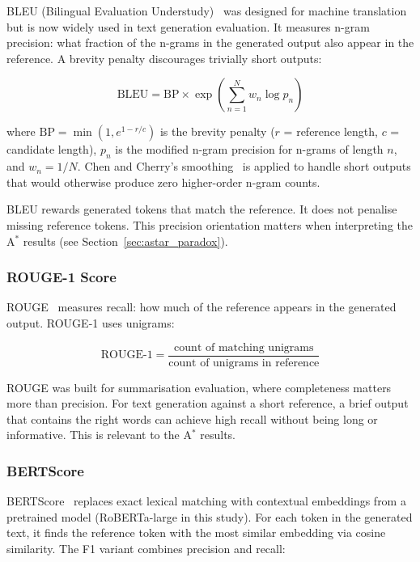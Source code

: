 \documentclass[12pt]{article}
\begin{document}
	BLEU (Bilingual Evaluation Understudy)~\cite{papineni2002bleu} was designed for machine translation but is now widely used in text generation evaluation. It measures n-gram precision: what fraction of the n-grams in the generated output also appear in the reference. A brevity penalty discourages trivially short outputs:
	
	\begin{equation}
		\mathrm{BLEU} = \mathrm{BP} \times \exp\!\left(\sum_{n=1}^{N} w_n \log p_n\right)
		\label{eq:bleu}
	\end{equation}
	
	where $\mathrm{BP} = \min(1, e^{1-r/c})$ is the brevity penalty ($r$ = reference length, $c$ = candidate length), $p_n$ is the modified n-gram precision for n-grams of length $n$, and $w_n = 1/N$. Chen and Cherry's smoothing~\cite{chen2014bleu_smooth} is applied to handle short outputs that would otherwise produce zero higher-order n-gram counts.
	
	BLEU rewards generated tokens that match the reference. It does not penalise missing reference tokens. This precision orientation matters when interpreting the A$^*$ results (see Section~\ref{sec:astar_paradox}).
	
	\subsubsection{ROUGE-1 Score}
	
	ROUGE~\cite{lin2004rouge} measures recall: how much of the reference appears in the generated output. ROUGE-1 uses unigrams:
	
	\begin{equation}
		\mathrm{ROUGE\text{-}1} = \frac{\text{count of matching unigrams}}{\text{count of unigrams in reference}}
		\label{eq:rouge}
	\end{equation}
	
	ROUGE was built for summarisation evaluation, where completeness matters more than precision. For text generation against a short reference, a brief output that contains the right words can achieve high recall without being long or informative. This is relevant to the A$^*$ results.
	
	\subsubsection{BERTScore}
	
	BERTScore~\cite{zhang2020bertscore} replaces exact lexical matching with contextual embeddings from a pretrained model (RoBERTa-large in this study). For each token in the generated text, it finds the reference token with the most similar embedding via cosine similarity. The F1 variant combines precision and recall:
	
\end{document}
